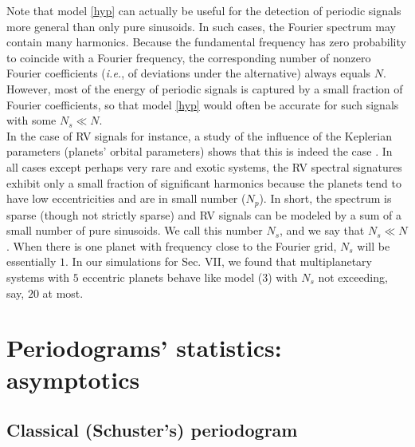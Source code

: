 \documentclass[journal]{IEEEtran}
\begin{document}
{
Note that model \eqref{hyp} can actually be useful for the detection of periodic signals more general than only pure sinusoids.
In such cases, the Fourier spectrum may contain many harmonics. Because the fundamental frequency has zero probability to coincide with a Fourier frequency, the corresponding number of nonzero Fourier coefficients (\textit{i.e.}, of deviations under the alternative) always equals $N$.
However, most of the energy of periodic signals is captured by a small fraction of Fourier coefficients, so that model \eqref{hyp}  would often be accurate for such signals
 with some $N_s\ll N$. \\
 In the case of RV signals for instance, a study of the influence of the Keplerian parameters (planets' { orbital} parameters) shows that this  is indeed the case \cite{Sulis_2016c}.
In all  cases except perhaps very rare and 
exotic systems, the RV spectral signatures exhibit only a small fraction { of} significant harmonic{s} because the planets 
 tend to have low eccentricities and are in small number ($N_p$). In short, the spectrum is sparse (though not strictly sparse) and RV signals can be modeled by a sum of a
small number of  pure sinusoids.
We call this number $N_s$, and we say that $N_s \ll N$. When there is one planet with frequency close to the Fourier grid, $N_s$
will be essentially $1$. In our simulations { for} Sec. VII, we found that  multiplanetary systems with $5$ eccentric planets behave
like model (3) with $N_s$ not exceeding, say,  $20$ at most. 
}

\section{Periodograms' statistics: asymptotics}
 \label{sec3}
  
\subsection{Classical (Schuster's) periodogram}
 
\end{document}
